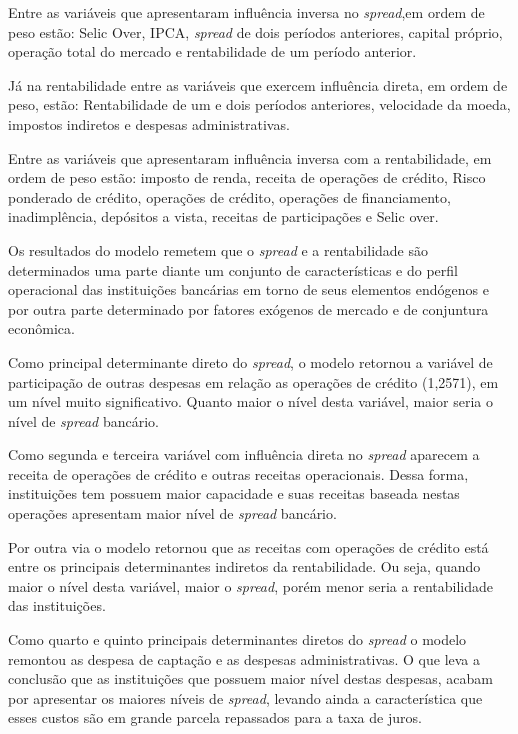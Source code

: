 \documentclass[
  12pt,
  12pt,
  openright,
  oneside,
  a4paper,
  chapter=TITLE,
  section=TITLE,
  subsection=TITLE,
  subsubsection=TITLE,
  english,
  portugues,
  sumario=tradicional]{abntex2}
\begin{document}
Entre as variáveis que apresentaram influência inversa no \emph{spread},em ordem de peso estão: Selic Over, IPCA, \emph{spread} de dois períodos anteriores, capital próprio, operação total do mercado e rentabilidade de um período anterior.

Já na rentabilidade entre as variáveis que exercem influência direta, em ordem de peso, estão: Rentabilidade de um e dois períodos anteriores, velocidade da moeda, impostos indiretos e despesas administrativas.

Entre as variáveis que apresentaram influência inversa com a rentabilidade, em ordem de peso estão: imposto de renda, receita de operações de crédito, Risco ponderado de crédito, operações de crédito, operações de financiamento, inadimplência, depósitos a vista, receitas de participações e Selic over.

Os resultados do modelo remetem que o \emph{spread} e a rentabilidade são determinados uma parte diante um conjunto de características e do perfil operacional das instituições bancárias em torno de seus elementos endógenos e por outra parte determinado por fatores exógenos de mercado e de conjuntura econômica.

Como principal determinante direto do \emph{spread}, o modelo retornou a variável de participação de outras despesas em relação as operações de crédito (1,2571), em um nível muito significativo. Quanto maior o nível desta variável, maior seria o nível de \emph{spread} bancário.

Como segunda e terceira variável com influência direta no \emph{spread} aparecem a receita de operações de crédito e outras receitas operacionais. Dessa forma, instituições tem possuem maior capacidade e suas receitas baseada nestas operações apresentam maior nível de \emph{spread} bancário.

Por outra via o modelo retornou que as receitas com operações de crédito está entre os principais determinantes indiretos da rentabilidade. Ou seja, quando maior o nível desta variável, maior o \emph{spread}, porém menor seria a rentabilidade das instituições.

Como quarto e quinto principais determinantes diretos do \emph{spread} o modelo remontou as despesa de captação e as despesas administrativas. O que leva a conclusão que as instituições que possuem maior nível destas despesas, acabam por apresentar os maiores níveis de \emph{spread}, levando ainda a característica que esses custos são em grande parcela repassados para a taxa de juros.
\end{document}
